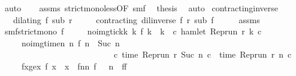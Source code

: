 \begin{isabellebody}
\ auto\isanewline
\ \ \isamarkupfalse%
\ assms{\isacharparenleft}{}{\isacharparenright}\ strict{\isacharunderscore}mono{\isacharunderscore}less{\isacharbrackleft}OF\ smf{\isacharbrackright}\ \isamarkupfalse%
\ {\isacharquery}thesis\ \isamarkupfalse%
\ auto\isanewline
{}\isamarkupfalse%
%
\endisatagproof
{\isafoldproof}%
%
\isadelimproof
\isanewline
%
\endisadelimproof
\isanewline
{}\isamarkupfalse%
\ contracting{\isacharunderscore}inverse{\isacharcolon}\isanewline
\ \ \ {\isacartoucheopen}dilating\ f\ sub\ r{\isacartoucheclose}\isanewline
\ \ \ \ \ {\isacartoucheopen}contracting\ {\isacharparenleft}dil{\isacharunderscore}inverse\ f{\isacharparenright}\ r\ sub\ f{\isacartoucheclose}\isanewline
%
\isadelimproof
%
\endisadelimproof
%
\isatagproof
{}\isamarkupfalse%
\ {\isacharminus}\isanewline
\ \ \isamarkupfalse%
\ assms\ \isamarkupfalse%
\ smf{\isacharcolon}{\isacartoucheopen}strict{\isacharunderscore}mono\ f{\isacartoucheclose}\isanewline
\ \ \ \ \ no{\isacharunderscore}img{\isacharunderscore}tick{\isacharcolon}{\isacartoucheopen}{\isasymforall}k{\isachardot}\ {\isacharparenleft}{\isasymnexists}k\ f\ k\ {\isacharequal}\ k{\isacharparenright}\ {\isasymlongrightarrow}\ {\isacharparenleft}{\isasymforall}c{\isachardot}\ {\isasymnot}{\isacharparenleft}hamlet\ {\isacharparenleft}{\isacharparenleft}Rep{\isacharunderscore}run\ r{\isacharparenright}\ k\ c{\isacharparenright}{\isacharparenright}{\isacharparenright}{\isacartoucheclose}\isanewline
\ \ \ \ \ no{\isacharunderscore}img{\isacharunderscore}time{\isacharcolon}{\isacartoucheopen}{\isasymAnd}n{\isachardot}\ {\isacharparenleft}{\isasymnexists}n\ f\ n\ {\isacharequal}\ {\isacharparenleft}Suc\ n{\isacharparenright}{\isacharparenright}\isanewline
\ \ \ \ \ \ \ \ \ \ \ \ \ \ \ \ \ \ \ \ \ \ \ \ \ \ {\isasymlongrightarrow}\ {\isacharparenleft}{\isasymforall}c{\isachardot}\ time\ {\isacharparenleft}{\isacharparenleft}Rep{\isacharunderscore}run\ r{\isacharparenright}\ {\isacharparenleft}Suc\ n{\isacharparenright}\ c{\isacharparenright}\ {\isacharequal}\ time\ {\isacharparenleft}{\isacharparenleft}Rep{\isacharunderscore}run\ r{\isacharparenright}\ n\ c{\isacharparenright}{\isacharparenright}{\isacartoucheclose}\isanewline
\ \ \ \ \ fxge{\isacharcolon}{\isacartoucheopen}{\isasymforall}x{\isachardot}\ f\ x\ {\isasymge}\ x{\isacartoucheclose}\ \ f{}n{\isacharcolon}{\isacartoucheopen}{\isasymAnd}n{\isachardot}\ f\ {}\ {\isasymle}\ n{\isacartoucheclose}\ \ f{}{\isacharcolon}{\isacartoucheopen}f\ {}\ {\isacharequal}\ {}{\isacartoucheclose}\isanewline

\end{isabellebody}
